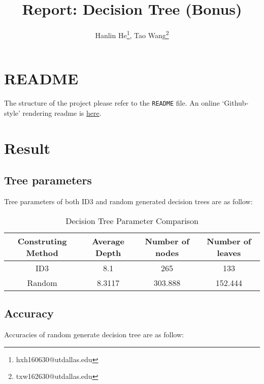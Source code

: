 \documentclass[12pt, letterpaper]{article}
\title{Report: Decision Tree (Bonus)}
\author{Hanlin He\footnote{hxh160630@utdallas.edu},
Tao Wang\footnote{txw162630@utdallas.edu}}
\begin{document}
\maketitle

\section*{README}

The structure of the project please refer to the \texttt{README} file. An online `Github-style' rendering readme is \href{https://cs6375.github.io/DecisionTree/}{here}.


\section*{Result}

\subsection*{Tree parameters}

Tree parameters of both ID3 and random generated decision trees are as follow:

\begin{table}[H]
\centering
\caption{Decision Tree Parameter Comparison}\label{t1}
\begin{tabular}{cccc}\toprule
Construting Method & Average Depth & Number of nodes & Number of leaves \\\midrule
ID3 & 8.1 & 265 & 133 \\
Random\footnotemark & 8.3117 & 303.888 & 152.444\\\bottomrule
\end{tabular}
\end{table}


\subsection*{Accuracy}

Accuracies of random generate decision tree are as follow:

\begin{table}[H]
\centering
\caption{Random Generated Decision Tree Comparison on DataSet 1}
\end{table}
\end{document}
